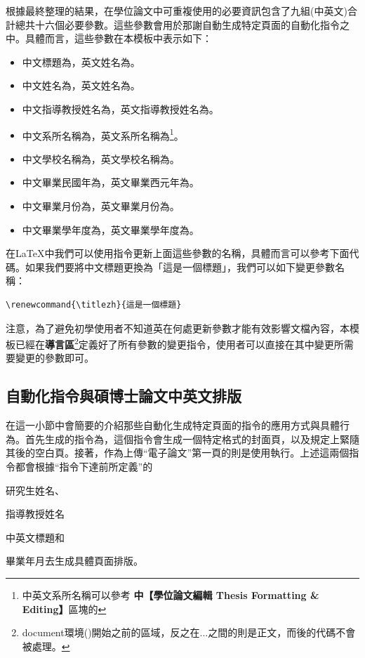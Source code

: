 \documentclass[12pt]{report}
\theoremstyle{plain}
\renewcommand{\titlezh}{集成自動化工具的 \LaTeX{} 臺北科技大學學位論文模板與使用指引}
\begin{document}
根據最終整理的結果，在學位論文中可重複使用的必要資訊包含了九組(中英文)合計總共十六個必要參數。這些參數會用於那謝自動生成特定頁面的自動化指令之中。具體而言，這些參數在本模板中表示如下：
\begin{itemize}
    \item 中文標題為，英文姓名為。
    \item 中文姓名為，英文姓名為。
    \item 中文指導教授姓名為，英文指導教授姓名為。
    \item 中文系所名稱為，英文系所名稱為\footnote{中英文系所名稱可以參考 \cite{ntutlibdown} \textbf{中【學位論文編輯 Thesis Formatting \& Editing】}區塊的}。
    \item 中文學校名稱為，英文學校名稱為。
    \item 中文畢業民國年為，英文畢業西元年為。
    \item 中文畢業月份為，英文畢業月份為。
    \item 中文畢業學年度為，英文畢業學年度為。
\end{itemize}
在\LaTeX 中我們可以使用指令更新上面這些參數的名稱，具體而言可以參考下面代碼。如果我們要將中文標題更換為「這是一個標題」，我們可以如下變更參數名稱：
\begin{lstlisting}
\renewcommand{\titlezh}{這是一個標題}
\end{lstlisting}

注意，為了避免初學使用者不知道英在何處更新參數才能有效影響文檔內容，本模板已經在\textbf{導言區}\footnote{document環境()開始之前的區域，反之在...之間的則是正文，而後的代碼不會被處理。}定義好了所有參數的變更指令，使用者可以直接在其中變更所需要變更的參數即可。

\subsection{自動化指令與碩博士論文中英文排版}

在這一小節中會簡要的介紹那些自動化生成特定頁面的指令的應用方式與具體行為。首先生成的指令為，這個指令會生成一個特定格式的封面頁，以及規定上緊隨其後的空白頁。接著，作為上傳``電子論文''第一頁的則是使用執行。上述這兩個指令都會根據``指令下達前所定義''的
\begin{enumerate*}
    \item 研究生姓名、
    \item 指導教授姓名
    \item 中英文標題和
    \item 畢業年月去生成具體頁面排版。
\end{enumerate*}
\end{document}
